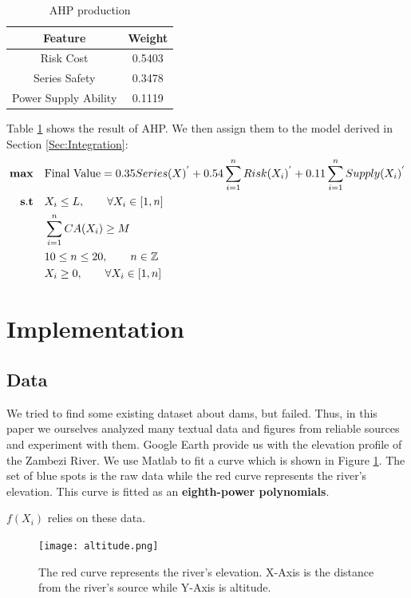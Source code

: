 \documentclass{mcmthesis}
\begin{document}
\begin{table}[h]
    \centering
    \caption{AHP production}
    \label{tab:AHP}
    \begin{tabular}{c c}
\hline
    	Feature & Weight\\
\hline
	Risk Cost & 0.5403\\
	Series Safety & 0.3478\\
	Power Supply Ability & 0.1119\\
\hline
    \end{tabular}
\end{table}

Table \ref{tab:AHP} shows the result of AHP. We then assign them to the model derived in Section \ref{Sec:Integration}:
\begin{equation*}
\begin{split}
 {\bf max}\quad &\text{Final Value}  = 0.35Series(X)^{'} + 0.54\sum_{i=1}^{n}{Risk(X_i)^{'}} + 0.11\sum_{i=1}^{n}{Supply(X_i)^{'}}\\
  {\bf s.t}\quad  &X_i \le L, \qquad \forall X_i \in [1,n]\\
	& \sum_{i=1}^{n}{CA(X_i)}\ge M\\
     	& 10\le n\le 20, \qquad n \in \mathbb{Z} \\
	& X_i \ge 0, \qquad \forall X_i \in [1,n]\\
\end{split}
\end{equation*}


\section{Implementation} \label{Sec-Implementation}
\subsection{Data}\label{Sec:Data}
We tried to find some existing dataset about dams, but failed. Thus, in this paper we ourselves analyzed many textual data and figures from reliable sources and experiment with them. Google Earth provide us with the elevation profile of the Zambezi River. We use Matlab to fit a curve which is shown in Figure \ref{fig:altitude}. The set of blue spots is the raw data while the red curve represents the river's elevation. This curve is fitted as an \textbf{eighth-power polynomials}.

$f(X_i)$ relies on these data.
\begin{figure}[h]
    \centering
    \texttt{[image: altitude.png]}
    \caption{The red curve represents the river's elevation. X-Axis is the distance from the river's source while Y-Axis is altitude.}
    \label{fig:altitude}
\end{figure}
\end{document}

